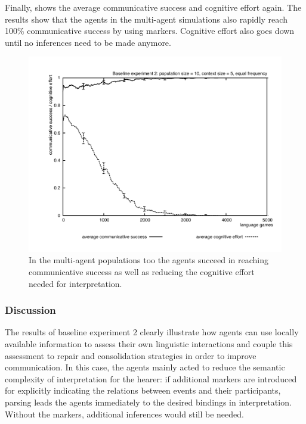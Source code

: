 Finally,  shows the average communicative success and cognitive effort again. The results show that the agents in the multi-agent simulations also rapidly reach 100\% communicative success by using markers. Cognitive effort also goes down until no inferences need to be made anymore.

\begin{figure} 
\centerline{\includegraphics[width=\textwidth]{Chapter3/figs/graph-base2-effort2}}
  \caption[Baseline experiment 2: success and effort (equal frequency)]{In the multi-agent populations too the agents succeed in reaching communicative success as well as reducing the cognitive effort needed for interpretation.}
   \label{f:base2-effort2}
\end{figure}

\subsubsection{Discussion}
 The results of baseline experiment 2 clearly illustrate how agents can use locally available information to assess their own linguistic interactions and couple this assessment to repair and consolidation strategies in order to improve communication. In this case, the agents mainly acted to reduce the semantic complexity of interpretation for the hearer: if additional markers are introduced for explicitly indicating the relations between events and their participants, parsing leads the agents immediately to the desired bindings in interpretation. Without the markers, additional inferences would still be needed.

